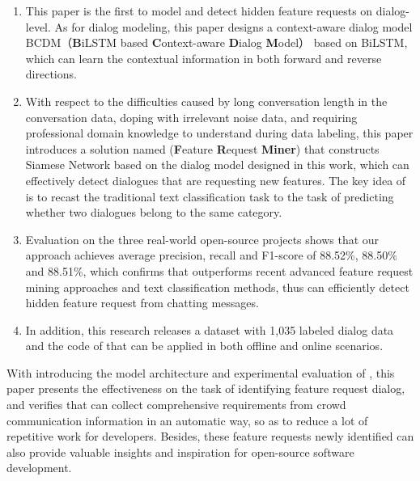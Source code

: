 \setlist[enumerate]{}%
\begin{enumerate}[nosep]
\item This paper is the first to model and detect hidden feature requests on dialog-level. As for dialog modeling, this paper designs a context-aware dialog model BCDM（\textbf{B}iLSTM based \textbf{C}ontext-aware \textbf{D}ialog \textbf{M}odel） based on BiLSTM, which can learn the contextual information in both forward and reverse directions.
\item With respect to the difficulties caused by long conversation length in the conversation data, doping with irrelevant noise data, and requiring professional domain knowledge to understand during data labeling, this paper introduces a solution named {\tool}(\textbf{F}eature \textbf{R}equest \textbf{Miner}) that constructs Siamese Network based on the dialog model {\dm} designed in this work, which can effectively detect dialogues that are requesting new features. The key idea of {\tool} is to recast the traditional text classification task to the task of predicting whether two dialogues belong to the same category. 
\item Evaluation on the three real-world open-source projects shows that our approach achieves average precision, recall and F1-score of 88.52\%, 88.50\% and 88.51\%, which confirms that {\tool} outperforms recent advanced feature request mining approaches and text classification methods, thus can efficiently detect hidden feature request from chatting messages.
\item In addition, this research releases a dataset with 1,035 labeled dialog data and the code of {\tool} that can be applied in both offline and online scenarios.
\end{enumerate}


With introducing the model architecture and experimental evaluation of {\tool}, this paper presents the effectiveness on the task of identifying feature request dialog, and verifies that {\tool} can collect comprehensive requirements from crowd communication information in an automatic way, so as to reduce a lot of repetitive work for developers. Besides, these feature requests newly identified can also provide valuable insights and inspiration for open-source software development.
 

